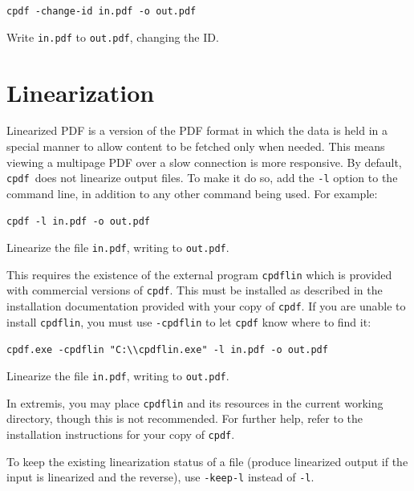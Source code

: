 \documentclass{book}
\newcommand{\cpdf}{\texttt{cpdf}}
\begin{document}
\begin{framed}
\noindent\small\verb!cpdf -change-id in.pdf -o out.pdf!

\vspace{2.5mm}
\noindent Write \texttt{in.pdf} to \texttt{out.pdf}, changing the ID.
\end{framed}

\section{Linearization}
Linearized PDF is a version of the PDF format in which the data is held in a
special manner to allow content to be fetched only when needed. This means
viewing a multipage PDF over a slow connection is more responsive. By default,
\cpdf\ does not linearize output files. To make it do so, add the \texttt{-l}
option to the command line, in addition to any other command being used. For example:

\begin{framed}
\noindent\small\verb!cpdf -l in.pdf -o out.pdf!

\vspace{2.5mm}
\noindent Linearize the file \texttt{in.pdf}, writing to \texttt{out.pdf}.
\end{framed}

\noindent This requires the existence of the external program \texttt{cpdflin} which is provided with commercial versions of \texttt{cpdf}. This must be installed as described in the installation documentation provided with your copy of \texttt{cpdf}. If you are unable to install \texttt{cpdflin}, you must use \texttt{-cpdflin} to let \texttt{cpdf} know where to find it:

\begin{framed}
\noindent\small\verb!cpdf.exe -cpdflin "C:\\cpdflin.exe" -l in.pdf -o out.pdf!

\vspace{2.5mm}
\noindent Linearize the file \texttt{in.pdf}, writing to \texttt{out.pdf}.
\end{framed}

\noindent In extremis, you may place \texttt{cpdflin} and its resources in the current working directory, though this is not recommended. For further help, refer to the installation instructions for your copy of \texttt{cpdf}.

To keep the existing linearization status of a file (produce linearized output if the input is linearized and the reverse), use \texttt{-keep-l} instead of \texttt{-l}.
\end{document}

